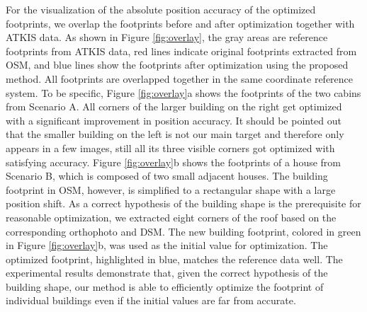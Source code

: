 For the visualization of the absolute position accuracy of the optimized footprints, we overlap the footprints before and after optimization together with ATKIS data. As shown in Figure \ref{fig:overlay}, the gray areas are reference footprints from ATKIS data, red lines indicate original footprints extracted from OSM, and blue lines show the footprints after optimization using the proposed method. All footprints are overlapped together in the same coordinate reference system. To be specific, Figure \ref{fig:overlay}a shows the footprints of the two cabins from Scenario A. All corners of the larger building on the right get optimized with a significant improvement in position accuracy. It should be pointed out that the smaller building on the left is not our main target and therefore only appears in a few images, still all its three visible corners got optimized with satisfying accuracy. Figure \ref{fig:overlay}b shows the footprints of a house from Scenario B, which is composed of two small adjacent houses. The building footprint in OSM, however, is simplified to a rectangular shape with a large position shift. As a correct hypothesis of the building shape is the prerequisite for reasonable optimization, we extracted eight corners of the roof based on the corresponding orthophoto and DSM. The new building footprint, colored in green in Figure \ref{fig:overlay}b, was used as the initial value for optimization. The optimized footprint, highlighted in blue, matches the reference data well. The experimental results demonstrate that, given the correct hypothesis of the building shape, our method is able to efficiently optimize the footprint of individual buildings even if the initial values are far from accurate.


